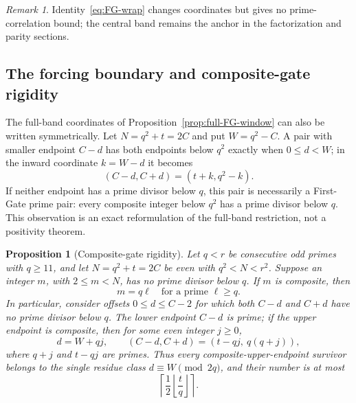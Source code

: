 \documentclass[final,11pt]{elsarticle}
\newtheorem{proposition}[theorem]{Proposition}
\theoremstyle{definition}
\theoremstyle{remark}
\newtheorem{remark}[theorem]{Remark}
\numberwithin{equation}{section}
\begin{document}
\begin{remark}\label{rem:FG-wrap-scope}
Identity~\eqref{eq:FG-wrap} changes coordinates but gives no prime-correlation bound; the central band remains the anchor in the factorization and parity sections.
\end{remark}

\subsection{The forcing boundary and composite-gate rigidity}
\label{subsec:composite-gates}

The full-band coordinates of Proposition~\ref{prop:full-FG-window}
can also be written symmetrically.  Let $N=q^2+t=2C$ and put
$W=q^2-C$.  A pair with smaller endpoint $C-d$ has both
endpoints below $q^2$ exactly when $0\le d<W$; in the inward
coordinate $k=W-d$ it becomes
\[
(C-d,C+d)=(t+k,q^2-k).
\]
If neither endpoint has a prime divisor below $q$, this pair is
necessarily a First-Gate prime pair: every composite integer below
$q^2$ has a prime divisor below $q$.  This observation is an exact
reformulation of the full-band restriction, not a positivity theorem.

\begin{proposition}[Composite-gate rigidity]\label{prop:composite-gates}
Let $q<r$ be consecutive odd primes with $q\ge11$, and let
$N=q^2+t=2C$ be even with $q^2<N<r^2$.  Suppose an integer
$m$, with $2\le m<N$, has no prime divisor below $q$.  If $m$
is composite, then
\[
\boxed{m=q\ell\quad\text{for a prime }\ell\ge q.}
\]
In particular, consider offsets $0\le d\le C-2$ for which
both $C-d$ and $C+d$ have no prime divisor below $q$.
The lower endpoint $C-d$ is prime; if the upper endpoint is
composite, then for some even integer $j\ge0$,
\[
\boxed{d=W+qj,\qquad
(C-d,C+d)=(t-qj,\ q(q+j)),}
\]
where $q+j$ and $t-qj$ are primes.  Thus every
composite-upper-endpoint survivor belongs to the single residue
class $d\equiv W\pmod{2q}$, and their number is at most
\[
\left\lceil\frac12\left\lfloor\frac tq\right\rfloor\right\rceil.
\]
\end{proposition}
\end{document}
